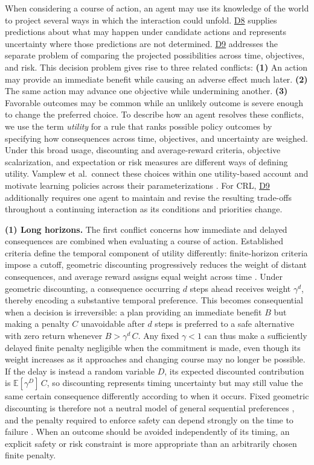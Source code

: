 \documentclass[10pt,journal,compsoc]{IEEEtran}
\DeclareRobustCommand{\Dref}[1]{\hyperref[sec:d#1]{D#1}}
\begin{document}
\noindent When considering a course of action, an agent may use its knowledge of the world to project several ways in which the interaction could unfold.
\Dref{8} supplies predictions about what may happen under candidate actions and represents uncertainty where those predictions are not determined.
\Dref{9} addresses the separate problem of comparing the projected possibilities across time, objectives, and risk.
This decision problem gives rise to three related conflicts:
\textbf{(1)} An action may provide an immediate benefit while causing an adverse effect much later.
\textbf{(2)} The same action may advance one objective while undermining another.
\textbf{(3)} Favorable outcomes may be common while an unlikely outcome is severe enough to change the preferred choice.
To describe how an agent resolves these conflicts, we use the term \emph{utility} for a rule that ranks possible policy outcomes by specifying how consequences across time, objectives, and uncertainty are weighed.
Under this broad usage, discounting and average-reward criteria, objective scalarization, and expectation or risk measures are different ways of defining utility.
Vamplew et al.\ connect these choices within one utility-based account and motivate learning policies across their parameterizations \cite{vamplew2024}.
For CRL, \Dref{9} additionally requires one agent to maintain and revise the resulting trade-offs throughout a continuing interaction as its conditions and priorities change.

\noindent\textbf{(1) Long horizons.}
The first conflict concerns how immediate and delayed consequences are combined when evaluating a course of action.
Established criteria define the temporal component of utility differently: finite-horizon criteria impose a cutoff, geometric discounting progressively reduces the weight of distant consequences, and average reward assigns equal weight across time \cite{puterman1994,sutton2018}.
Under geometric discounting, a consequence occurring $d$ steps ahead receives weight $\gamma^d$, thereby encoding a substantive temporal preference.
This becomes consequential when a decision is irreversible: a plan providing an immediate benefit $B$ but making a penalty $C$ unavoidable after $d$ steps is preferred to a safe alternative with zero return whenever $B > \gamma^d\,C$.
Any fixed $\gamma<1$ can thus make a sufficiently delayed finite penalty negligible when the commitment is made, even though its weight increases as it approaches and changing course may no longer be possible.
If the delay is instead a random variable $D$, its expected discounted contribution is $\mathbb{E}[\gamma^D]\,C$, so discounting represents timing uncertainty but may still value the same certain consequence differently according to when it occurs.
Fixed geometric discounting is therefore not a neutral model of general sequential preferences \cite{pitis2019}, and the penalty required to enforce safety can depend strongly on the time to failure \cite{massiani2023}.
When an outcome should be avoided independently of its timing, an explicit safety or risk constraint is more appropriate than an arbitrarily chosen finite penalty.
\end{document}
